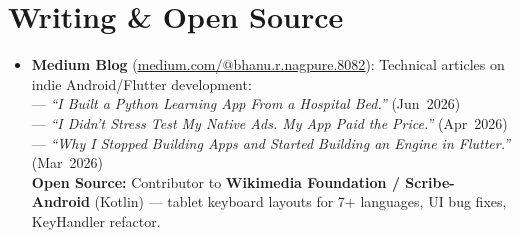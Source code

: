 \documentclass[letterpaper,11pt]{article}
\newcommand{\resumeSubHeadingListStart}{
  \begin{itemize}[leftmargin=0.13in, label={}, itemsep=2pt, parsep=0pt]
}
\newcommand{\resumeSubHeadingListEnd}{\end{itemize}}
\begin{document}
\section{Writing \& Open Source}

\resumeSubHeadingListStart
  \item\small{
    \textbf{Medium Blog} (\href{https://medium.com/@bhanu.r.nagpure.8082}{\underline{medium.com/@bhanu.r.nagpure.8082}}): Technical articles on indie Android/Flutter development: \\[2pt]
    \hspace{1em}--- \textit{``I Built a Python Learning App From a Hospital Bed.''} (Jun~2026) \\
    \hspace{1em}--- \textit{``I Didn't Stress Test My Native Ads. My App Paid the Price.''} (Apr~2026) \\
    \hspace{1em}--- \textit{``Why I Stopped Building Apps and Started Building an Engine in Flutter.''} (Mar~2026) \\[2pt]
    \textbf{Open Source:} Contributor to \textbf{Wikimedia Foundation / Scribe-Android} (Kotlin) — tablet keyboard layouts for 7+ languages, UI bug fixes, KeyHandler refactor.
  }
\resumeSubHeadingListEnd
\end{document}

